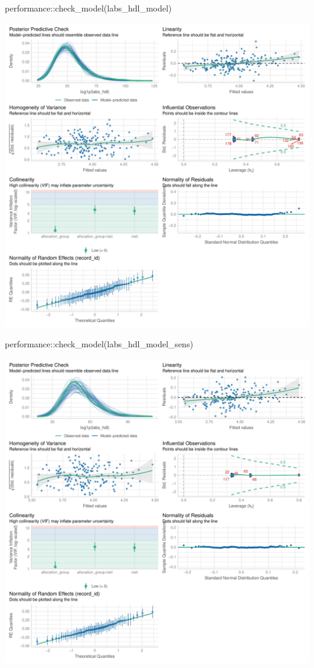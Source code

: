 \documentclass[
  12pt,
]{article}
\newenvironment{Shaded}{\begin{snugshade}}{\end{snugshade}}
\newcommand{\FunctionTok}[1]{\textcolor[rgb]{0.28,0.35,0.67}{#1}}
\newcommand{\NormalTok}[1]{\textcolor[rgb]{0.00,0.23,0.31}{#1}}
\newcommand{\SpecialCharTok}[1]{\textcolor[rgb]{0.37,0.37,0.37}{#1}}
\begin{document}
\begin{Shaded}
\begin{Highlighting}[]
\NormalTok{performance}\SpecialCharTok{::}\FunctionTok{check\_model}\NormalTok{(labs\_hdl\_model)}
\end{Highlighting}
\end{Shaded}

\includegraphics{Outcomes_files/figure-pdf/labs_hdl_4-1.pdf}

\begin{Shaded}
\begin{Highlighting}[]
\NormalTok{performance}\SpecialCharTok{::}\FunctionTok{check\_model}\NormalTok{(labs\_hdl\_model\_sens)}
\end{Highlighting}
\end{Shaded}

\includegraphics{Outcomes_files/figure-pdf/labs_hdl_4-2.pdf}
\end{document}
